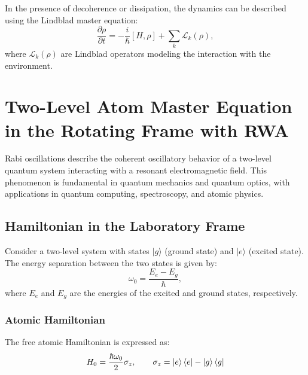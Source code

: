 In the presence of decoherence or dissipation, the dynamics can be described using the Lindblad master equation:
\begin{equation}
	\frac{\partial \rho}{\partial t} = -\frac{i}{\hbar} [H, \rho] + \sum_k \mathcal{L}_k(\rho),
	\label{eq:Lindblad}
\end{equation}
where \(\mathcal{L}_k(\rho)\) are Lindblad operators modeling the interaction with the environment.


\section{Two-Level Atom Master Equation in the Rotating Frame with RWA}

Rabi oscillations describe the coherent oscillatory behavior of a two-level quantum system interacting with a resonant electromagnetic field.
This phenomenon is fundamental in quantum mechanics and quantum optics, with applications in quantum computing, spectroscopy, and atomic physics.

\subsection{Hamiltonian in the Laboratory Frame}

Consider a two-level system with states \(|g\rangle\) (ground state) and \(|e\rangle\) (excited state).
The energy separation between the two states is given by:
\begin{equation}
	\omega_0 = \frac{E_e - E_g}{\hbar},
	\label{eq:EnergySeparation}
\end{equation}
where \(E_e\) and \(E_g\) are the energies of the excited and ground states, respectively.

\subsubsection{Atomic Hamiltonian}
The free atomic Hamiltonian is expressed as:
\begin{equation}
	H_0 = \frac{\hbar\omega_0}{2} \sigma_z, \qquad \sigma_z = \ket{e}\bra{e} - \ket{g}\bra{g}
	\label{eq:AtomicHamiltonian}
\end{equation}

